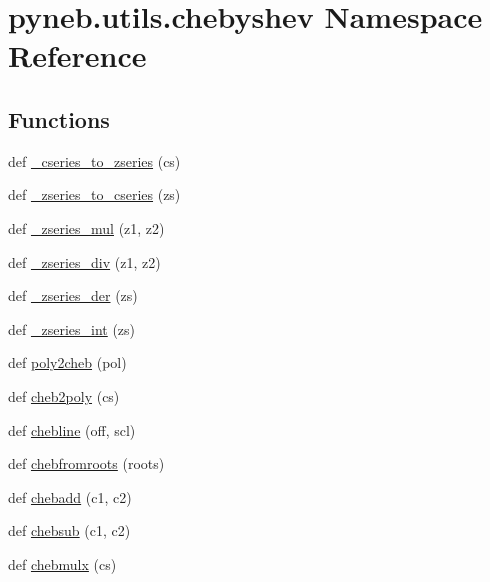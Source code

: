 \hypertarget{namespacepyneb_1_1utils_1_1chebyshev}{}\section{pyneb.\+utils.\+chebyshev Namespace Reference}
\label{namespacepyneb_1_1utils_1_1chebyshev}
\subsection*{Functions}
\begin{DoxyCompactItemize}
\item 
def \hyperlink{namespacepyneb_1_1utils_1_1chebyshev_a659e346f7cdd9fd058850b26f7e95b17}{\+\_\+cseries\+\_\+to\+\_\+zseries} (cs)
\item 
def \hyperlink{namespacepyneb_1_1utils_1_1chebyshev_a2a88474ce0ea12fb26f82b7116752dc1}{\+\_\+zseries\+\_\+to\+\_\+cseries} (zs)
\item 
def \hyperlink{namespacepyneb_1_1utils_1_1chebyshev_a46d958933482afac66ea41d143155dae}{\+\_\+zseries\+\_\+mul} (z1, z2)
\item 
def \hyperlink{namespacepyneb_1_1utils_1_1chebyshev_ad00f2653194746fa98c3421eb7c26f2c}{\+\_\+zseries\+\_\+div} (z1, z2)
\item 
def \hyperlink{namespacepyneb_1_1utils_1_1chebyshev_adb39b6e9d3aba3bf3784a3364ec3e6ca}{\+\_\+zseries\+\_\+der} (zs)
\item 
def \hyperlink{namespacepyneb_1_1utils_1_1chebyshev_a39d3ae73408fcde399d87f5cfd5e7c98}{\+\_\+zseries\+\_\+int} (zs)
\item 
def \hyperlink{namespacepyneb_1_1utils_1_1chebyshev_a1f91018c86380adf38318e4e224279e7}{poly2cheb} (pol)
\item 
def \hyperlink{namespacepyneb_1_1utils_1_1chebyshev_a640344fc14aa36e14d0e93eba4411188}{cheb2poly} (cs)
\item 
def \hyperlink{namespacepyneb_1_1utils_1_1chebyshev_ad14ae6340a5a9e3c93c1bb720f4e5a04}{chebline} (off, scl)
\item 
def \hyperlink{namespacepyneb_1_1utils_1_1chebyshev_abedf5cf14ea9229321fc5e4043c42a0d}{chebfromroots} (roots)
\item 
def \hyperlink{namespacepyneb_1_1utils_1_1chebyshev_a06a85eb72ae35925336a6b550dec3f02}{chebadd} (c1, c2)
\item 
def \hyperlink{namespacepyneb_1_1utils_1_1chebyshev_ac07c70b217882a8c0a731ce9fdf743f0}{chebsub} (c1, c2)
\item 
def \hyperlink{namespacepyneb_1_1utils_1_1chebyshev_ab09f8accee50bd964e03071a659a7b5f}{chebmulx} (cs)

\end{DoxyCompactItemize}

